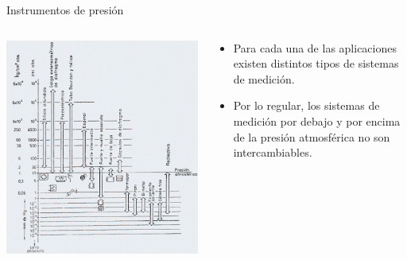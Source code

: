 \documentclass[aspectratio=169]{beamer}
\begin{document}
\begin{frame}{Instrumentos de presión}
    \begin{columns}[c, onlytextwidth]
        \begin{column}{0.45\textwidth}
        \includegraphics[width = 0.9 \linewidth]{fig/Presion/Instrumentos.PNG}
            
            \tiny{\cite{sole2005instrumentacion}}
            
        \end{column}
        \begin{column}{0.50\textwidth}
            \begin{itemize}
                \item Para cada una de las aplicaciones existen distintos tipos de sistemas de medición. 
                \item Por lo regular, los sistemas de medición por debajo y por encima de la presión atmosférica no son intercambiables.
            \end{itemize}
        \end{column}
    \end{columns}

            
\end{frame}
\end{document}
